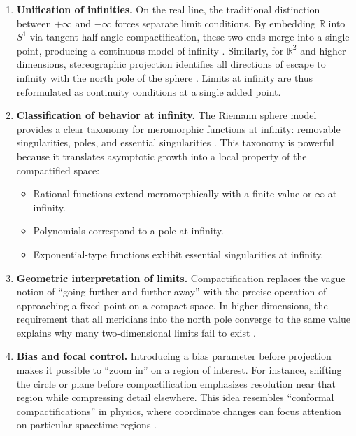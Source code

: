 \documentclass[12pt]{article}
\theoremstyle{remark}
\begin{document}
\begin{enumerate}
    \item \textbf{Unification of infinities.}  
    On the real line, the traditional distinction between $+\infty$ and $-\infty$ 
    forces separate limit conditions. By embedding $\mathbb{R}$ into $S^1$ via 
    tangent half-angle compactification, these two ends merge into a single 
    point, producing a continuous model of infinity \citep{munkres2000topology}. 
    Similarly, for $\mathbb{R}^2$ and higher dimensions, stereographic projection 
    identifies all directions of escape to infinity with the north pole of the 
    sphere \citep{ahlfors1979complex,needham1997visual}. 
    Limits at infinity are thus reformulated as continuity conditions at a 
    single added point.

    \item \textbf{Classification of behavior at infinity.}  
    The Riemann sphere model provides a clear taxonomy for meromorphic functions 
    at infinity: removable singularities, poles, and essential singularities 
    \citep{ahlfors1979complex,rudin1987realcomplex}. 
    This taxonomy is powerful because it translates asymptotic growth into 
    a local property of the compactified space:
    \begin{itemize}
        \item Rational functions extend meromorphically with a finite value or $\infty$ at infinity.  
        \item Polynomials correspond to a pole at infinity.  
        \item Exponential-type functions exhibit essential singularities at infinity.  
    \end{itemize}

    \item \textbf{Geometric interpretation of limits.}  
    Compactification replaces the vague notion of “going further and further 
    away” with the precise operation of approaching a fixed point on a compact 
    space. In higher dimensions, the requirement that all meridians into the 
    north pole converge to the same value explains why many two-dimensional 
    limits fail to exist \citep{rudin1987realcomplex}.

    \item \textbf{Bias and focal control.}  
    Introducing a bias parameter before projection makes it possible to 
    “zoom in” on a region of interest. For instance, shifting the circle or 
    plane before compactification emphasizes resolution near that region while 
    compressing detail elsewhere. This idea resembles “conformal compactifications” 
    in physics, where coordinate changes can focus attention on particular 
    spacetime regions \citep{penrose1964conformal}.


\end{enumerate}
\end{document}
